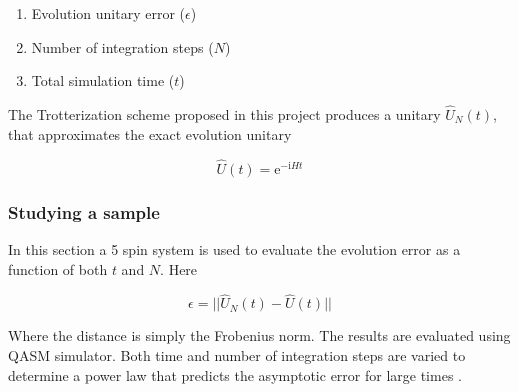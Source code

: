 \begin{enumerate}
\def\labelenumi{\arabic{enumi}.}
\tightlist
\item
  Evolution unitary error (\(\epsilon\))
\item
  Number of integration steps (\(N\))
\item
  Total simulation time (\(t\))
\end{enumerate}

The Trotterization scheme proposed in this project produces a unitary
\(\hat{U}_N(t)\), that approximates the exact evolution unitary

\[
\hat{U}(t) = \mathrm{e}^{-\mathrm{i}\hat{H}t}
\]

    \hypertarget{studying-a-sample}{%
\subsubsection{Studying a sample}\label{studying-a-sample}}

In this section a 5 spin system is used to evaluate the evolution error
as a function of both \(t\) and \(N\). Here

\[
\epsilon = ||\hat{U}_N(t) - \hat{U}(t)||
\]

Where the distance is simply the Frobenius norm. The results are
evaluated using QASM simulator. Both time and number of integration
steps are varied to determine a power law that predicts the asymptotic
error for large times .

